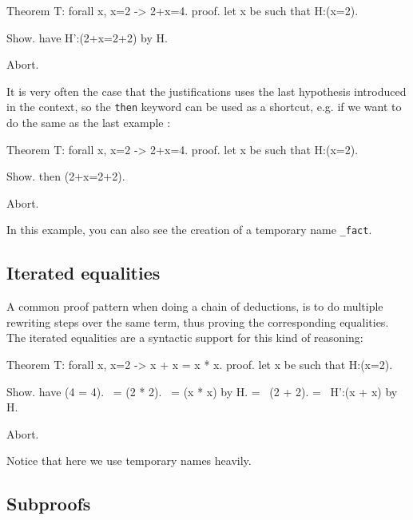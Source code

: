 \begin{coq_eval}
Theorem T: forall x, x=2 -> 2+x=4.
proof.
let x be such that H:(x=2).
\end{coq_eval} 
\begin{coq_example}
 Show.
 have H':(2+x=2+2) by H.
\end{coq_example}
\begin{coq_eval}
Abort.
\end{coq_eval}

It is very often the case that the justifications uses the last hypothesis introduced in the context, so the {\tt then} keyword can be used as a shortcut, e.g. if we want to do the same as the last example :
 
\begin{coq_eval}
Theorem T: forall x, x=2 -> 2+x=4.
proof.
let x be such that H:(x=2).
\end{coq_eval} 
\begin{coq_example}
 Show.
 then (2+x=2+2).
\end{coq_example}
\begin{coq_eval}
Abort.
\end{coq_eval}

In this example, you can also see the creation of a temporary name {\tt \_fact}.

\subsection{Iterated equalities}

A common proof pattern when doing a chain of deductions, is to do
multiple rewriting steps over the same term, thus proving the
corresponding equalities. The iterated equalities are a syntactic
support for this kind of reasoning:

\begin{coq_eval}
Theorem T: forall x, x=2 -> x + x = x * x.
proof.
let x be such that H:(x=2).
\end{coq_eval} 
\begin{coq_example}
 Show.
 have (4 = 4).
        ~= (2 * 2).
        ~= (x * x) by H.
        =~ (2 + 2).
        =~ H':(x + x) by H.
\end{coq_example}
\begin{coq_eval}
Abort.
\end{coq_eval}

Notice that here we use temporary names heavily.

\subsection{Subproofs}

